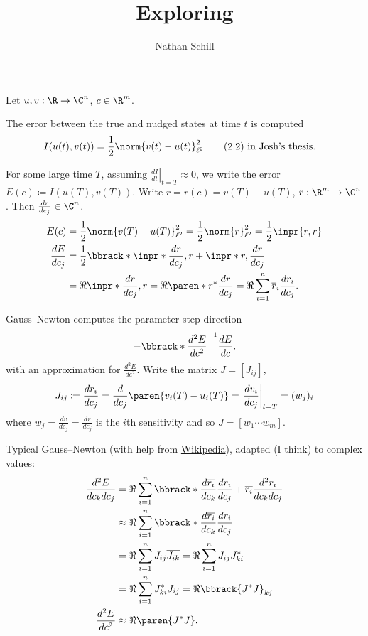 \documentclass[12pt]{article}
\title{Exploring}
\author{Nathan Schill}
\date{}
\begin{document}
\maketitle

Let $u, v: \R \rightarrow \C^n$, $c \in \R^m$.

The error between the true and nudged states at time $t$ is computed
\begin{align*}
  I(u(t), v(t))
  &= \frac12 \norm{v(t) - u(t)}_{\ell^2}^2 \qquad \text{(2.2) in
  Josh's thesis}.
\end{align*}

For some large time $T$, assuming $\left.\frac {dI} {dt}
\right|_{t=T} \approx 0$, we write the error $E(c) \coloneqq I(u(T), v(T))$.
Write $r = r(c) = v(T) - u(T)$, $r: \R^m \rightarrow \C^n$.
Then $\frac{dr}{dc_j} \in \C^n$.
\begin{align*}
  E(c)
  &= \frac12 \norm{v(T) - u(T)}^2_{\ell^2}= \frac12 \norm{r}^2_{\ell^2}  =
  \frac12 \inpr{r, r} \\
  \frac{dE}{dc_j}
  &= \frac12 \bbrack*{
    \inpr*{\frac{dr}{dc_j}, r} + \inpr*{r, \frac{dr}{dc_j}}
  } \\
  &= \Re \inpr*{\frac{dr}{dc_j}, r} = \Re \paren*{r^* \frac{dr}{dc_j}}
  = \Re \sum_{i=1}^n \overline r_i \frac{dr_i}{dc_j}.
\end{align*}

Gauss--Newton computes the parameter step direction
\begin{equation*}
  -\bbrack*{\frac{d^2 E}{dc^2}}^{-1} \frac{dE}{dc}.
\end{equation*}
with an approximation for $\frac{d^2 E}{dc^2}$.
Write the matrix $J = [J_{ij}]$,
\begin{equation*}
  J_{ij} \coloneqq \frac{dr_i}{dc_j} = \frac d{dc_j} \paren{v_i(T) -
  u_i(T)} = \left.\frac{dv_i}{dc_j} \right|_{t=T} = (w_j)_i
\end{equation*}
where $w_j = \frac{dv}{dc_j} = \frac{dr}{dc_j}$ is the $i$th
sensitivity and so $J = [w_1 \cdots w_m]$.

Typical Gauss--Newton (with help from
  \href{https://en.wikipedia.org/wiki/Gauss%E2%80%93Newton_algorithm#Derivation_from_Newton's_method}{Wikipedia}),
adapted (I think) to complex values:
\begin{align*}
  \frac{d^2E}{dc_k dc_j}
  &= \Re \sum_{i=1}^n \bbrack*{
    \frac{d \overline{r_i}}{dc_k} \frac{dr_i}{dc_j} +
    \overline{r_i} \frac{d^2 r_i}{dc_k dc_j}
  } \\
  &\approx \Re \sum_{i=1}^n \bbrack*{
    \frac{d \overline{r_i}}{dc_k} \frac{dr_i}{dc_j}
  } \\
  &= \Re \sum_{i=1}^n J_{ij} \overline{J_{ik}}
  = \Re \sum_{i=1}^n J_{ij} J_{ki}^* \\
  &= \Re \sum_{i=1}^n J_{ki}^* J_{ij}
  = \Re \bbrack{J^* J}_{kj} \\
  \frac{d^2 E}{dc^2}
  &\approx \Re \paren{J^* J}.
\end{align*}
\end{document}
